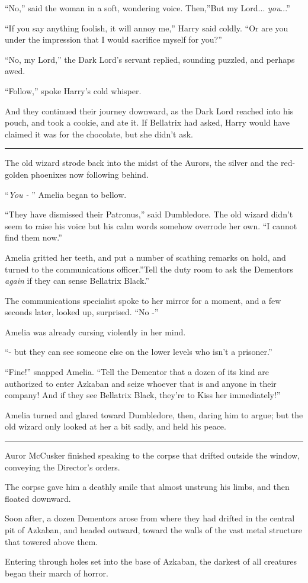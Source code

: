 ``No,'' said the woman in a soft, wondering voice. Then,''But my
Lord... \emph{you}...''

``If you say anything foolish, it will annoy me,'' Harry said coldly.
``Or are you under the impression that I would sacrifice myself for
you?''

``No, my Lord,'' the Dark Lord's servant replied, sounding puzzled, and
perhaps awed.

``Follow,'' spoke Harry's cold whisper.

And they continued their journey downward, as the Dark Lord reached into
his pouch, and took a cookie, and ate it. If Bellatrix had asked, Harry
would have claimed it was for the chocolate, but she didn't ask.

\begin{center}\rule{3in}{0.4pt}\end{center}

The old wizard strode back into the midst of the Aurors, the silver and
the red-golden phoenixes now following behind.

``\emph{You -} '' Amelia began to bellow.

``They have dismissed their Patronus,'' said Dumbledore. The old wizard
didn't seem to raise his voice but his calm words somehow overrode her
own. ``I cannot find them now.''

Amelia gritted her teeth, and put a number of scathing remarks on hold,
and turned to the communications officer.''Tell the duty room to ask the
Dementors \emph{again} if they can sense Bellatrix Black.''

The communications specialist spoke to her mirror for a moment, and a
few seconds later, looked up, surprised. ``No -''

Amelia was already cursing violently in her mind.

``- but they can see someone else on the lower levels who isn't a
prisoner.''

``Fine!'' snapped Amelia. ``Tell the Dementor that a dozen of its kind
are authorized to enter Azkaban and seize whoever that is and anyone in
their company! And if they see Bellatrix Black, they're to Kiss her
immediately!''

Amelia turned and glared toward Dumbledore, then, daring him to argue;
but the old wizard only looked at her a bit sadly, and held his peace.

\begin{center}\rule{3in}{0.4pt}\end{center}

Auror McCusker finished speaking to the corpse that drifted outside the
window, conveying the Director's orders.

The corpse gave him a deathly smile that almost unstrung his limbs, and
then floated downward.

Soon after, a dozen Dementors arose from where they had drifted in the
central pit of Azkaban, and headed outward, toward the walls of the vast
metal structure that towered above them.

Entering through holes set into the base of Azkaban, the darkest of all
creatures began their march of horror.
